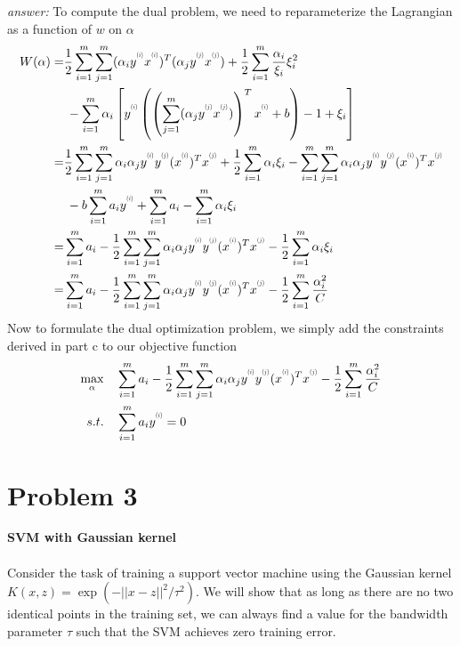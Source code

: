 \documentclass{article}
\newcommand{\supi}[1]{\scalebox{0.6}[0.75]{$^{(#1)}$}}\newcommand{\supi}{\scalebox{0.6}[0.75]{$^{(i)}$}}
\begin{document}
\begin{enumerate}[label=(\alph*)]
    \textit{answer:} To compute the dual problem, we need to reparameterize the Lagrangian as a function of $w$ on $\alpha$ \begin{align*}
        W(\alpha)=&\frac{1}{2}\sum_{i=1}^{m}\sum_{j=1}^{m}(\alpha_i y^{\supi{i}}x^{\supi{i}})^T (\alpha_j y^{\supi{j}}x^{\supi{j}})+\frac{1}{2}\sum_{i=1}^{m}\frac{\alpha_i}{\xi_i}\xi_i^2\\
        &\: -\sum_{i=1}^{m}\alpha_i\left[y^{\supi{i}}\left(\left(\sum_{j=1}^{m}(\alpha_j y^{\supi{j}}x^{\supi{j}})\right)^T x^{\supi{i}}+b\right)-1+\xi_i\right]\\
        =&\frac{1}{2}\sum_{i=1}^{m}\sum_{j=1}^{m}\alpha_i\alpha_jy^{\supi{i}}y^{\supi{j}}(x^{\supi{i}})^Tx^{\supi{j}}+\frac{1}{2}\sum_{i=1}^{m}\alpha_i\xi_i-\sum_{i=1}^{m}\sum_{j=1}^{m}\alpha_i\alpha_jy^{\supi{i}}y^{\supi{j}}(x^{\supi{i}})^Tx^{\supi{j}}\\&\:-b\sum_{i=1}^{m}a_iy^{\supi{i}} + \sum_{i=1}^{m}a_i-\sum_{i=1}^{m}\alpha_i\xi_i\\
        =&\sum_{i=1}^{m}a_i-\frac{1}{2}\sum_{i=1}^{m}\sum_{j=1}^{m}\alpha_i\alpha_jy^{\supi{i}}y^{\supi{j}}(x^{\supi{i}})^Tx^{\supi{j}}-\frac{1}{2}\sum_{i=1}^{m}\alpha_i\xi_i\\
        =&\sum_{i=1}^{m}a_i-\frac{1}{2}\sum_{i=1}^{m}\sum_{j=1}^{m}\alpha_i\alpha_jy^{\supi{i}}y^{\supi{j}}(x^{\supi{i}})^Tx^{\supi{j}}-\frac{1}{2}\sum_{i=1}^{m}\frac{\alpha_i^2}{C}
    \end{align*} 
   Now to formulate the dual optimization problem, we simply add the constraints derived in part c to our objective function\begin{align*}
        \max_{\alpha }\quad &\sum_{i=1}^{m}a_i-\frac{1}{2}\sum_{i=1}^{m}\sum_{j=1}^{m}\alpha_i\alpha_jy^{\supi{i}}y^{\supi{j}}(x^{\supi{i}})^Tx^{\supi{j}}-\frac{1}{2}\sum_{i=1}^{m}\frac{\alpha_i^2}{C}\\
        s.t. \quad &\sum_{i=1}^{m}a_iy^{\supi{i}}=0
    \end{align*}
\end{enumerate}


\section{Problem 3}
\textbf{SVM with Gaussian kernel}\\\\
Consider the task of training a support vector machine using the Gaussian kernel $K(x,z) = \exp(-||x-z||^2/\tau^2)$. We will show that as long as there are no two identical points in the
training set, we can always find a value for the bandwidth parameter $\tau$ such that the SVM
achieves zero training error.
\end{document}
